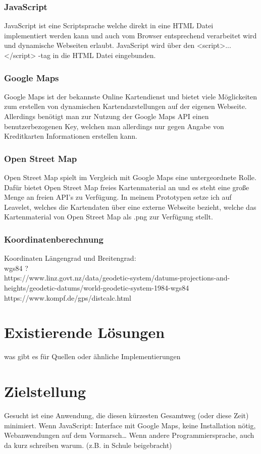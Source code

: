 \documentclass[a4paper, twoside, 12pt]{scrreprt}
\begin{document}
\subsection{JavaScript}
JavaScript ist eine Scriptsprache welche direkt in eine HTML Datei implementiert werden kann und auch vom Browser entsprechend verarbeitet wird und dynamische Webseiten erlaubt. JavaScript wird über den <script>...</script> -tag in die HTML Datei eingebunden.
\subsection{Google Maps}
Google Maps ist der bekannste Online Kartendienst und bietet viele Möglickeiten zum erstellen von dynamischen Kartendarstellungen auf der eigenen Webseite. Allerdings benötigt man zur Nutzung der Google Maps API einen benutzerbezogenen Key, welchen man allerdings nur gegen Angabe von Kreditkarten Informationen erstellen kann.
\subsection{Open Street Map}
Open Street Map spielt im Vergleich mit Google Maps eine untergeordnete Rolle. Dafür bietet Open Street Map freies Kartenmaterial an und es steht eine große Menge an freien API's zu Verfügung. In meinem Prototypen setze ich auf Leavelet, welches die Kartendaten über eine externe Webseite bezieht, welche das Kartenmaterial von Open Street Map als .png zur Verfügung stellt.
\subsection{Koordinatenberechnung}
Koordinaten Längengrad und Breitengrad:\\ wgs84 ? \\
https://www.linz.govt.nz/data/geodetic-system/datums-projections-and-heights/geodetic-datums/world-geodetic-system-1984-wgs84 \\
https://www.kompf.de/gps/distcalc.html
\chapter{Existierende Lösungen}
was gibt es für Quellen oder ähnliche Implementierungen
\chapter{Zielstellung}
Gesucht ist eine Anwendung, die diesen kürzesten Gesamtweg (oder diese Zeit) minimiert.
Wenn JavaScript: Interface mit Google Maps, keine Installation nötig, Webanwendungen auf dem Vormarsch…
Wenn andere Programmiersprache, auch da kurz schreiben warum. (z.B. in Schule beigebracht)
\end{document}
